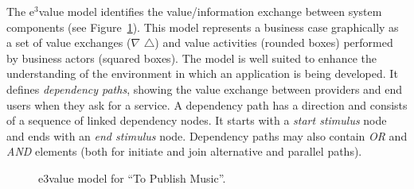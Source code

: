 \documentclass{singlecol-new}
\theoremstyle{TH}{
\newtheorem{lemma}{Lemma}
\newtheorem{theorem}[lemma]{Theorem}
\newtheorem{corrolary}[lemma]{Corrolary}
\newtheorem{conjecture}[lemma]{Conjecture}
\newtheorem{proposition}[lemma]{Proposition}
\newtheorem{claim}[lemma]{Claim}
\newtheorem{stheorem}[lemma]{Wrong Theorem}
\newtheorem{algorithm}{Algorithm}
}
\theoremstyle{THrm}{
\newtheorem{definition}{Definition}[section]
\newtheorem{question}{Question}[section]
\newtheorem{remark}{Remark}
\newtheorem{scheme}{Scheme}
}
\theoremstyle{THhit}{
\newtheorem{case}{Case}[section]
}
\theoremstyle{THhsl}{
\newtheorem{example}{Example}
}
\begin{document}
The e$^3$value model  identifies the value/in\-for\-ma\-tion  exchange between system components (see Figure~\ref{fig:CIM:tpme3v}).
This model  represents a business case graphically as a set of value exchanges  ($\nabla$ $\triangle$) and value activities (rounded boxes)\footnotemark {} performed by business actors (squared boxes).
The model is well suited to enhance the understanding of the environment in which an application is being developed.
It defines \textit{dependency paths}, showing the value exchange between providers and end users when they ask for a service.
A dependency path has a direction and consists of a sequence of linked dependency nodes.
It starts with a \textit{start stimulus} node and ends with an \textit{end stimulus} node.
Dependency paths may also contain \textsl{OR} and \textsl{AND} elements (both for initiate and join alternative and parallel paths).

\begin{figure}[h]
\center
{}
 
\caption{\label{fig:CIM:tpme3v} e3value model for ``To Publish Music''.}
\end{figure}
\end{document}

